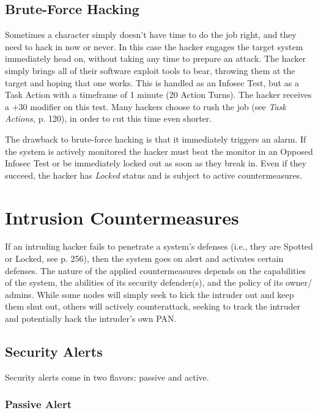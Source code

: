 \subsection{Brute-Force Hacking}

Sometimes a character simply doesn't have time to do 
the job right, and they need to hack in now or never. 
In this case the hacker engages the target system immediately
head on, without taking any time to prepare
an attack. The hacker simply brings all of their
software exploit tools to bear, throwing them at the 
target and hoping that one works. This is handled as 
an Infosec Test, but as a Task Action with a timeframe 
of 1 minute (20 Action Turns). The hacker receives 
a +30 modifier on this test. Many hackers choose to 
rush the job (see \textit{Task Actions,} p. 120), in order to cut 
this time even shorter.

The drawback to brute-force hacking is that it immediately
triggers an alarm. If the system is actively monitored
the hacker must beat the monitor in an Opposed
Infosec Test or be immediately locked out as soon as 
they break in. Even if they succeed, the hacker has 
\textit{Locked} status and is subject to active countermeasures.

\section{Intrusion Countermeasures}

If an intruding hacker fails to penetrate a system's 
defenses (i.e., they are Spotted or Locked, see p. 256), 
then the system goes on alert and activates certain 
defenses. The nature of the applied countermeasures 
depends on the capabilities of the system, the abilities 
of its security defender(s), and the policy of its owner/
admins. While some nodes will simply seek to kick 
the intruder out and keep them shut out, others will 
actively counterattack, seeking to track the intruder 
and potentially hack the intruder's own PAN.

\subsection{Security Alerts}

Security alerts come in two flavors: passive and active.

\subsubsection{Passive Alert}

